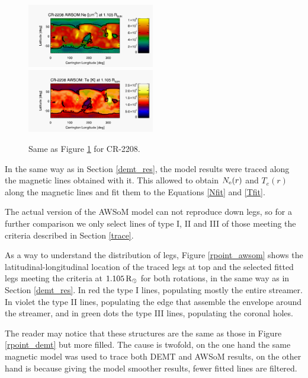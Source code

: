 \documentclass[namedreferences]{solarphysics}
\newcommand{\mrsun}{{\rm R_\odot}}
\newcommand{\Ne}{N_{\rm e}}
\def\temp#1{\textcolor{gray}{#1}}
\begin{document}
\begin{article}
\begin{figure}[h!]
\begin{center}
\includegraphics[width=0.495\textwidth]{figs/map_Ne_awsom_2208_185_short_1105_Rsun.pdf}
\includegraphics[width=0.495\textwidth]{figs/map_Te_awsom_2208_185_short_1105_Rsun.pdf}
\caption{Same as Figure \ref{carmaps_awsom_2208} for CR-2208.}
\label{carmaps_awsom_2208}
\end{center}
\end{figure}


In the same way as in Section \ref{demt_res}, the model results were traced along the magnetic lines obtained with it. This allowed to obtain $\Ne(r)$ and $T_e(r)$ along the magnetic lines and fit them to the Equations \ref{Nfit} and \ref{Tfit}.

The actual version of the AWSoM model can not reproduce down legs, so for a further comparison we only select lines of type I, II and III of those meeting the criteria described in Section \ref{trace}.

As a way to understand the distribution of legs, Figure \ref{rpoint_awsom} shows the latitudinal-longitudinal location of the traced legs at top and the selected fitted legs meeting the criteria at $1.105\,\mrsun$ for both rotations, in the same way as in Section \ref{demt_res}. In red the type I lines, populating mostly the entire streamer. In violet the type II lines, populating the edge that assemble the envelope around the streamer, and in green dots the type III lines, populating the coronal holes.

The reader may notice that these structures are the same as those in Figure \ref{rpoint_demt} but more filled. The cause is twofold, on the one hand the same magnetic model was used to trace both DEMT and AWSoM results, on the other hand is because giving the model smoother results, fewer fitted lines are filtered.



\end{article}
\end{document}

